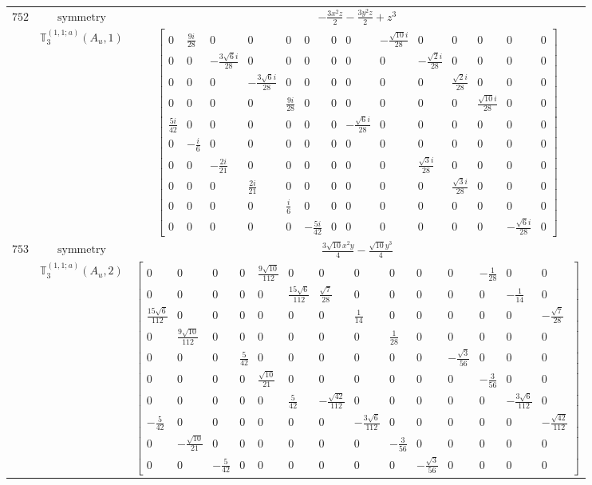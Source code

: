 \documentclass[fleqn,8pt,landscape]{jsarticle}
\begin{document}
\begin{longtable}{ccc}
$ 752 $ & $ \text{symmetry} $ & $ - \frac{3 x^{2} z}{2} - \frac{3 y^{2} z}{2} + z^{3} $ \\
$  $ & $ \mathbb{T}_{3}^{(1,1;a)}(A_{u},1) $ & $ \begin{bmatrix} 0 & \frac{9 i}{28} & 0 & 0 & 0 & 0 & 0 & 0 & - \frac{\sqrt{10} i}{28} & 0 & 0 & 0 & 0 & 0 \\ 0 & 0 & - \frac{3 \sqrt{6} i}{28} & 0 & 0 & 0 & 0 & 0 & 0 & - \frac{\sqrt{2} i}{28} & 0 & 0 & 0 & 0 \\ 0 & 0 & 0 & - \frac{3 \sqrt{6} i}{28} & 0 & 0 & 0 & 0 & 0 & 0 & \frac{\sqrt{2} i}{28} & 0 & 0 & 0 \\ 0 & 0 & 0 & 0 & \frac{9 i}{28} & 0 & 0 & 0 & 0 & 0 & 0 & \frac{\sqrt{10} i}{28} & 0 & 0 \\ \frac{5 i}{42} & 0 & 0 & 0 & 0 & 0 & 0 & - \frac{\sqrt{6} i}{28} & 0 & 0 & 0 & 0 & 0 & 0 \\ 0 & - \frac{i}{6} & 0 & 0 & 0 & 0 & 0 & 0 & 0 & 0 & 0 & 0 & 0 & 0 \\ 0 & 0 & - \frac{2 i}{21} & 0 & 0 & 0 & 0 & 0 & 0 & \frac{\sqrt{3} i}{28} & 0 & 0 & 0 & 0 \\ 0 & 0 & 0 & \frac{2 i}{21} & 0 & 0 & 0 & 0 & 0 & 0 & \frac{\sqrt{3} i}{28} & 0 & 0 & 0 \\ 0 & 0 & 0 & 0 & \frac{i}{6} & 0 & 0 & 0 & 0 & 0 & 0 & 0 & 0 & 0 \\ 0 & 0 & 0 & 0 & 0 & - \frac{5 i}{42} & 0 & 0 & 0 & 0 & 0 & 0 & - \frac{\sqrt{6} i}{28} & 0 \end{bmatrix} $ \\ \hline
$ 753 $ & $ \text{symmetry} $ & $ \frac{3 \sqrt{10} x^{2} y}{4} - \frac{\sqrt{10} y^{3}}{4} $ \\
$  $ & $ \mathbb{T}_{3}^{(1,1;a)}(A_{u},2) $ & $ \begin{bmatrix} 0 & 0 & 0 & 0 & \frac{9 \sqrt{10}}{112} & 0 & 0 & 0 & 0 & 0 & 0 & - \frac{1}{28} & 0 & 0 \\ 0 & 0 & 0 & 0 & 0 & \frac{15 \sqrt{6}}{112} & \frac{\sqrt{7}}{28} & 0 & 0 & 0 & 0 & 0 & - \frac{1}{14} & 0 \\ \frac{15 \sqrt{6}}{112} & 0 & 0 & 0 & 0 & 0 & 0 & \frac{1}{14} & 0 & 0 & 0 & 0 & 0 & - \frac{\sqrt{7}}{28} \\ 0 & \frac{9 \sqrt{10}}{112} & 0 & 0 & 0 & 0 & 0 & 0 & \frac{1}{28} & 0 & 0 & 0 & 0 & 0 \\ 0 & 0 & 0 & \frac{5}{42} & 0 & 0 & 0 & 0 & 0 & 0 & - \frac{\sqrt{3}}{56} & 0 & 0 & 0 \\ 0 & 0 & 0 & 0 & \frac{\sqrt{10}}{21} & 0 & 0 & 0 & 0 & 0 & 0 & - \frac{3}{56} & 0 & 0 \\ 0 & 0 & 0 & 0 & 0 & \frac{5}{42} & - \frac{\sqrt{42}}{112} & 0 & 0 & 0 & 0 & 0 & - \frac{3 \sqrt{6}}{112} & 0 \\ - \frac{5}{42} & 0 & 0 & 0 & 0 & 0 & 0 & - \frac{3 \sqrt{6}}{112} & 0 & 0 & 0 & 0 & 0 & - \frac{\sqrt{42}}{112} \\ 0 & - \frac{\sqrt{10}}{21} & 0 & 0 & 0 & 0 & 0 & 0 & - \frac{3}{56} & 0 & 0 & 0 & 0 & 0 \\ 0 & 0 & - \frac{5}{42} & 0 & 0 & 0 & 0 & 0 & 0 & - \frac{\sqrt{3}}{56} & 0 & 0 & 0 & 0 \end{bmatrix} $ \\ \hline

\end{longtable}
\end{document}
